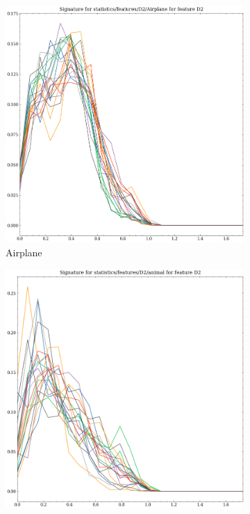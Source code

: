 \begin{figure}[t!p]
    \centering
    \begin{subfigure}[b]{0.23\textwidth}
        \includegraphics[width=\textwidth]{assets/feature_extraction/D2/Airplane.png}
        \caption{Airplane}
    \end{subfigure}
    \hfill
    \begin{subfigure}[b]{0.23\textwidth}
        \includegraphics[width=\textwidth]{assets/feature_extraction/D2/animal.png}

\end{subfigure}
\end{figure}
